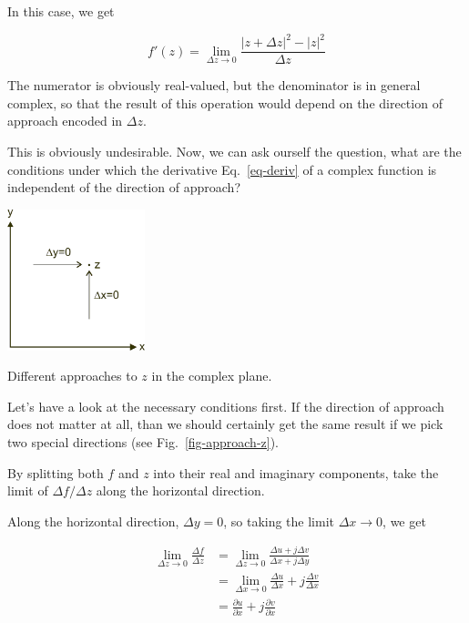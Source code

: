 In this case, we get

$$f'(z)=\lim_{\Delta z \to 0} \frac{|z+\Delta z|^2 - |z|^2}{\Delta z} $$

The numerator is obviously real-valued, but the denominator is in general complex, so that the result of this operation would depend on the direction of approach encoded in $\Delta z$.

This is obviously undesirable. Now, we can ask ourself the question, what are the conditions under which the derivative Eq.~\ref{eq-deriv} of a complex function is independent of the direction of approach?

\pagebreak


\begin{marginfigure}[0cm]
\includegraphics[width=4cm]{complex/figures/approach_z}
\caption{Different approaches to $z$ in the complex plane.}
\label{fig-approach-z}
\end{marginfigure}

Let's have a look at the necessary conditions first. If the direction of approach does not matter at all, than we should certainly get the same result if we pick two special directions (see Fig.~\ref{fig-approach-z}).

\begin{cue}
By splitting both $f$ and $z$ into their real and imaginary components, take the limit of $\Delta f / \Delta z$ along the horizontal direction.
\end{cue}

Along the horizontal direction, $\Delta y = 0$, so taking the limit $\Delta x \to 0$, we get

\begin{align}
\lim_{\Delta z \to 0} \frac{\Delta f}{\Delta z}
& = \lim_{\Delta z \to 0} \frac{\Delta u + j \Delta v}{\Delta x + j \Delta y}
\nonumber \\
& = \lim_{\Delta x \to 0} \frac{\Delta u}{\Delta x} + j \frac{\Delta v}{\Delta
x} \nonumber \\
& = \frac{\partial u}{\partial x} + j \frac{\partial v}{\partial
x}\label{eq-deriv-dx}
\end{align} 

